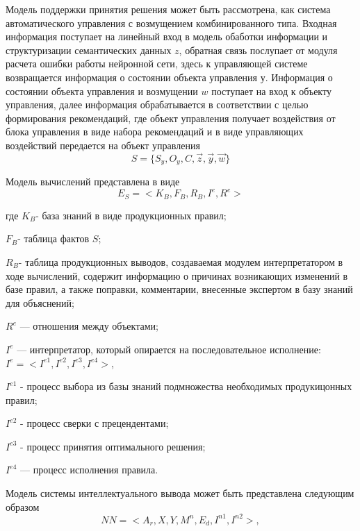 Модель поддержки принятия решения может быть рассмотрена, как система автоматического управления с возмущением комбинированного типа. Входная информация поступает на линейный вход в модель обаботки информации и структуризации семантических данных ${z}$, обратная связь послупает от модуля расчета ошибки работы нейронной сети, здесь к управляющей системе возвращается информация о состоянии объекта управления ${у}$. Информация о состоянии объекта управления и возмущении ${w}$ поступает на вход к объекту управления, далее информация обрабатывается в соответствии с целью формирования рекомендаций, где объект управления получает воздействия от блока управления в виде набора рекомендаций и в виде управляющих воздействий передается на объект управления
\begin{equation}
    \label{eq:equation30}
    S = \{S_y, O_y, C,  \overrightarrow{z}, \overrightarrow{y}, \overrightarrow{w}\}
\end{equation}

Модель вычислений представлена в виде
\begin{equation}
    \label{eq:equation30}
    E_S=<K_B,F_B,R_B,I^e,R^e>
\end{equation}


где $K_B$- база знаний в виде продукционных правил; 

$F_B$- таблица фактов $S$;

$R_B$- таблица продукционных выводов, создаваемая модулем интерпретатором в ходе вычислений, содержит информацию о причинах возникающих изменений в базе правил, а также поправки, комментарии, внесенные экспертом в базу знаний для объяснений; 

$R^e$ — отношения между объектами; 

$I^e$ — интерпретатор, который опирается на последовательное исполнение: $I^e =<I^{e1}, I^{e2}, I^{e3}, I^{e4}>$,

$I^{e1}$ - процесс выбора из базы знаний подмножества необходимых продукицонных правил; 

$I^{e2}$ - процесс сверки с прецендентами; 

$I^{e3}$ - процесс принятия оптимального решения; 

$I^{e4}$ — процесс исполнения правила.

Модель системы интеллектуального вывода может быть представлена следующим образом
\begin{equation}
    \label{eq:equation31}
    NN=<A_r,X,Y,M^n,E_d,I^{n1}, I^{n2} >,
\end{equation}

